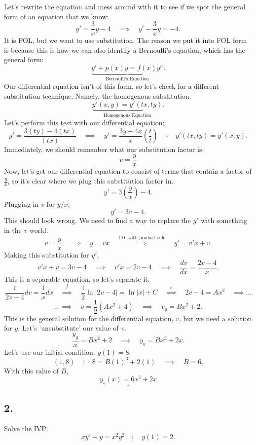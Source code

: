 \documentclass[a4paper,12pt]{article} %
\begin{document}
Let's rewrite the equation and mess around with it to see if we spot the general form of an equation that we know:
$$ y' = \frac{3}{x}y - 4 \quad\implies\quad y' - \frac{3}{x}y = -4. $$
It is FOL, but we want to use substitution. The reason we put it into FOL form is because this is how we can also identify a Bernoulli's equation, which has the general form:
$$ \underbrace{y' + p(x)y = f(x)y^{n}}_{\text{Bernoulli's Equation}}. $$
Our differential equation isn't of this form, so let's check for a different substitution technique. Namely, the homogenous substitution.
$$ \underbrace{y'(x, y) = y'(tx, ty)}_{\text{Homogenous Equation}}. $$
Let's perform this test with our differential equation:
$$ y' = \frac{3(ty) - 4(tx)}{(tx)} \quad\implies\quad y' = \frac{3y-4x}{x} \left(\frac{t}{t}\right) \quad\therefore\quad y'(tx, ty)=y'(x,y). $$
Immediately, we should remember what our substitution factor is:
$$ \boxed{v=\frac{y}{x}} $$
Now, let's get our differential equation to consist of terms that contain a factor of $\frac{y}{x}$, so it's clear where we plug this substitution factor in.
$$ y' = 3\left(\frac{y}{x}\right) - 4. $$
Plugging in $v$ for $y/x$,
$$ y' = 3v -4. $$
This should look wrong. We need to find a way to replace the $y'$ with something in the $v$ world.
$$ v=\frac{y}{x} \quad\implies\quad y = vx \quad\overset{\text{I.D. with product rule}}\implies\quad y' = v'x + v. $$
Making this substitution for $y'$,
$$ v'x + v = 3v - 4 \quad\implies\quad v'x = 2v-4 \quad\implies\quad \frac{dv}{dx} = \frac{2v-4}{x}. $$
This is a separable equation, so let's separate it.
$$ \frac{1}{2v-4}dv = \frac{1}{x}dx \quad\overset{\int}\implies\quad \frac{1}{2}\ln{|2v-4|} = \ln{|x|+C} \quad\overset{e}\implies\quad 2v-4 = Ax^2 \quad\implies\ldots$$
$$\ldots\implies\quad v=\frac{1}{2}\left(Ax^2+4\right) \quad\implies\quad v_g = Bx^2 + 2.  $$
This is the general solution for the differential equation, $v$, but we need a solution for $y$. Let's 'unsubstitute' our value of $v$.
$$ \frac{y_g}{x} = Bx^2 + 2 \quad\implies\quad y_g = Bx^3 + 2x. $$
Let's use our initial condition: $y(1)=8.$
$$ (1,8)\quad:\quad 8 = B(1)^3 + 2(1) \quad\implies\quad B = 6. $$
With this value of $B$,
$$ \underline{\boxed{y_s(x) = 6x^3 + 2x}} $$

\pagebreak

\subsection*{2.} 
Solve the IVP:
$$xy' + y = x^2y^2 \quad ; \quad y(1)=2.$$
\\
 
\end{document}
